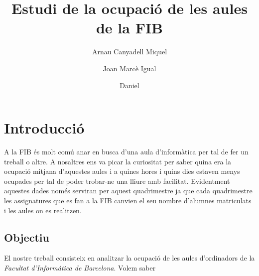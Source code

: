 \documentclass{article}
\begin{document}
\title{Estudi de la ocupació de les aules de la FIB}
\author{Arnau Canyadell Miquel \and Joan Marcè Igual \and Daniel}

\maketitle
\newpage
\tableofcontents

\newpage
\section{Introducció}

A la FIB és molt comú anar en busca d'una aula d'informàtica per tal de fer un treball o altre. A nosaltres ens va picar la curiositat per saber quina era la ocupació mitjana d'aquestes aules i a quines hores i quins dies estaven menys ocupades per tal de poder trobar-ne una lliure amb facilitat. Evidentment aquestes dades només serviran per aquest quadrimestre ja que cada quadrimestre les assignatures que es fan a la FIB canvien el seu nombre d'alumnes matriculats i les aules on es realitzen.

\subsection{Objectiu}

El nostre treball consisteix en analitzar la ocupació de les aules d'ordinadors de la \emph{Facultat d'Informàtica de Barcelona}. Volem saber 
\end{document}
